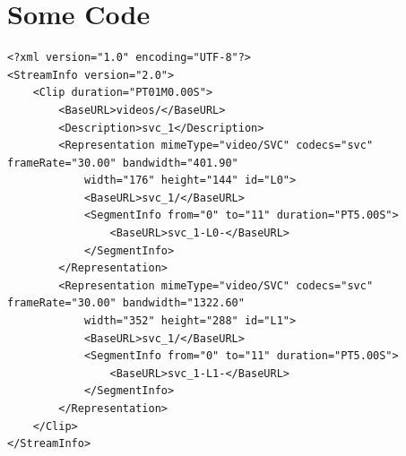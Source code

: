 \chapter{Some Code}
\label{chapter:appendixB}

\begin{lstlisting}[frame=lines,style=XML,caption={Example of a XML file.},label=xmlEx]
<?xml version="1.0" encoding="UTF-8"?>
<StreamInfo version="2.0">
    <Clip duration="PT01M0.00S">
        <BaseURL>videos/</BaseURL>
        <Description>svc_1</Description>
        <Representation mimeType="video/SVC" codecs="svc" frameRate="30.00" bandwidth="401.90"
            width="176" height="144" id="L0">
            <BaseURL>svc_1/</BaseURL>
            <SegmentInfo from="0" to="11" duration="PT5.00S">
                <BaseURL>svc_1-L0-</BaseURL>
            </SegmentInfo>
        </Representation>
        <Representation mimeType="video/SVC" codecs="svc" frameRate="30.00" bandwidth="1322.60"
            width="352" height="288" id="L1">
            <BaseURL>svc_1/</BaseURL>
            <SegmentInfo from="0" to="11" duration="PT5.00S">
                <BaseURL>svc_1-L1-</BaseURL>
            </SegmentInfo>
        </Representation>
    </Clip>
</StreamInfo>
\end{lstlisting}